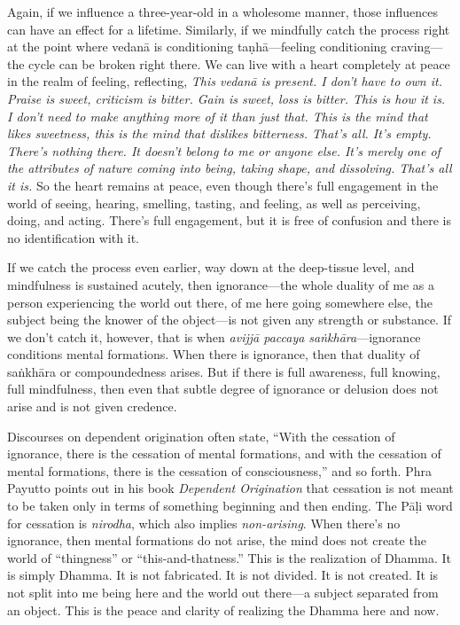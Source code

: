 Again, if we influence a three-year-old in a wholesome manner, those 
influences can have an effect for a lifetime. Similarly, if we 
mindfully catch the process right at the point where vedanā is 
conditioning taṇhā---feeling conditioning craving---the cycle can be 
broken right there. We can live with a heart completely at peace in the 
realm of feeling, reflecting, \emph{This vedanā is present. I don't 
have to own it. Praise is sweet, criticism is bitter. Gain is sweet, 
loss is bitter. This is how it is. I don't need to make anything more 
of it than just that. This is the mind that likes sweetness, this is 
the mind that dislikes bitterness. That's all. It's empty. There's 
nothing there. It doesn't belong to me or anyone else. It's merely one 
of the attributes of nature coming into being, taking shape, and 
dissolving. That's all it is.} So the heart remains at peace, even 
though there's full engagement in the world of seeing, hearing, 
smelling, tasting, and feeling, as well as perceiving, doing, and 
acting. There's full engagement, but it is free of confusion and there 
is no identification with it.

If we catch the process even earlier, way down at the deep-tissue 
level, and mindfulness is sustained acutely, then ignorance---the whole 
duality of me as a person experiencing the world out there, of me here 
going somewhere else, the subject being the knower of the object---is 
not given any strength or substance. If we don't catch it, however, 
that is when \emph{avijjā paccaya saṅkhāra}---ignorance conditions 
mental formations. When there is ignorance, then that duality of 
saṅkhāra or compoundedness arises. But if there is full awareness, 
full knowing, full mindfulness, then even that subtle degree of 
ignorance or delusion does not arise and is not given credence.

Discourses on dependent origination often state, ``With the cessation 
of ignorance, there is the cessation of mental formations, and with the 
cessation of mental formations, there is the cessation of 
consciousness,'' and so forth. Phra Payutto points out in his book 
\emph{Dependent Origination} that cessation is not meant to be taken 
only in terms of something beginning and then ending. The Pāḷi word 
for cessation is \emph{nirodha}, which also implies \emph{non-arising}. 
When there's no ignorance, then mental formations do not arise, the 
mind does not create the world of ``thingness'' or 
``this-and-thatness.'' This is the realization of Dhamma. It is simply 
Dhamma. It is not fabricated. It is not divided. It is not created. It 
is not split into me being here and the world out there---a subject 
separated from an object. This is the peace and clarity of realizing 
the Dhamma here and now.


